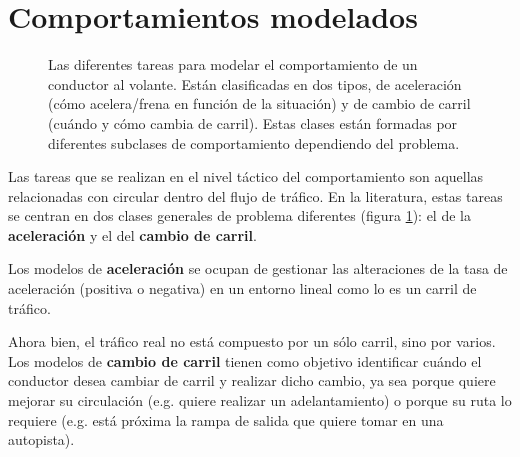 \section{Comportamientos modelados}

\begin{figure}
	\centering
	\caption{Las diferentes tareas para modelar el comportamiento de un conductor al volante. Están clasificadas en dos tipos, de aceleración (cómo acelera/frena en función de la situación) y de cambio de carril (cuándo y cómo cambia de carril). Estas clases están formadas por diferentes subclases de comportamiento dependiendo del problema.}
	\label{fig:behavior-model-classification}
\end{figure}

Las tareas que se realizan en el nivel táctico del comportamiento son aquellas relacionadas con circular dentro del flujo de tráfico. En la literatura, estas tareas se centran en dos clases generales de problema diferentes (figura \ref{fig:behavior-model-classification}): el de la \textbf{aceleración} y el del \textbf{cambio de carril}.

Los modelos de \textbf{aceleración} se ocupan de gestionar las alteraciones de la tasa de aceleración (positiva o negativa) en un entorno lineal como lo es un carril de tráfico.

Ahora bien, el tráfico real no está compuesto por un sólo carril, sino por varios. Los modelos de \textbf{cambio de carril} tienen como objetivo identificar cuándo el conductor desea cambiar de carril y realizar dicho cambio, ya sea porque quiere mejorar su circulación (e.g. quiere realizar un adelantamiento) o porque su ruta lo requiere (e.g. está próxima la rampa de salida que quiere tomar en una autopista).

